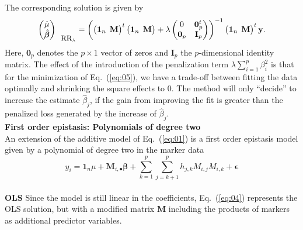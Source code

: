 \documentclass{bmcart}
\newcommand{\M}{\mathbf{M}}
\newcommand{\0}{\mathbf{0}}
\begin{document}
The corresponding solution is given by 
\begin{equation}
	\begin{pmatrix}
		\hat{\mu} \\
		\hat{\bm{\beta}}
	\end{pmatrix}_{\mbox{\small RR}_\lambda} =
	\left( 
	\begin{pmatrix}
		\mathbf{1}_n & \hspace{-0.2cm}\M
	\end{pmatrix}^{t}
	\begin{pmatrix}
		\mathbf{1}_n & \hspace{-0.2cm} \M
	\end{pmatrix} + \lambda \begin{pmatrix}
		0 & \mathbf{0 }_p^t \\
		\mathbf{0 }_p & \mathbf{I}_p
	\end{pmatrix} 
	\right)^{-1} 
	\begin{pmatrix}
		\mathbf{1}_n & \hspace{-0.2cm} \M
	\end{pmatrix}^{t}
	\mathbf{y}. \label{eq:06}
\end{equation}
Here, $\mathbf{0 }_p$ denotes the $p \times 1$ vector of zeros and $\mathbf{I}_p$ the $p$-dimensional identity matrix. 
The effect of the introduction of the penalization term $\lambda \sum\limits_{i=1}^p {\beta}_i^2$ is that for the minimization of Eq.~(\ref{eq:05}), we have a trade-off between fitting the data optimally and shrinking the square effects to $0$. The method will only ``decide'' to increase the estimate $\hat{\beta}_j$, if the gain from improving the fit is greater than the penalized loss generated by the increase of $\hat{\beta}_j$.  \vspace{0.4cm} \\
{\bf First order epistasis: Polynomials of degree two}\vspace{0.2cm}\\ 
An extension of the additive model of Eq.~(\ref{eq:01}) is a first order epistasis model given by a polynomial of degree two in the marker data \cite{ober15,jiang15,Martini16}
\begin{equation} \label{eq:07}
	y_i =\mathbf{1}_n \mu + \M_{i,\bullet}\bm{\beta} + \sum\limits_{k=1}^p\sum\limits_{j=k+1}^p h_{j,k}M_{i,j}M_{i,k} + \bm{\epsilon}
\end{equation}\vspace{0.1cm}\\
{\bf OLS} Since the model is still linear in the coefficients, Eq.~(\ref{eq:04}) represents the OLS solution, but with a modified matrix $\M$ including the products of markers as additional predictor variables. \vspace{0.4cm}\\
\end{document}
